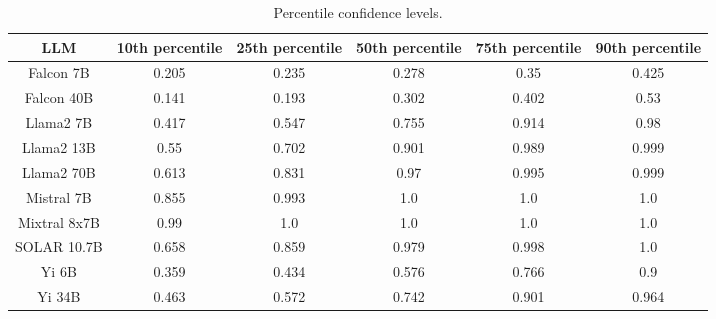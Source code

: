 \begin{table*}
\centering
\begin{tabular}{c|c|c|c|c|c}
LLM & 10th percentile & 25th percentile & 50th percentile & 75th percentile & 90th percentile\\ \hline
Falcon 7B & 0.205 & 0.235 & 0.278 & 0.35 & 0.425\\
Falcon 40B & 0.141 & 0.193 & 0.302 & 0.402 & 0.53\\
Llama2 7B & 0.417 & 0.547 & 0.755 & 0.914 & 0.98\\
Llama2 13B & 0.55 & 0.702 & 0.901 & 0.989 & 0.999\\
Llama2 70B & 0.613 & 0.831 & 0.97 & 0.995 & 0.999\\
Mistral 7B & 0.855 & 0.993 & 1.0 & 1.0 & 1.0\\
Mixtral 8x7B & 0.99 & 1.0 & 1.0 & 1.0 & 1.0\\
SOLAR 10.7B & 0.658 & 0.859 & 0.979 & 0.998 & 1.0\\
Yi 6B & 0.359 & 0.434 & 0.576 & 0.766 & 0.9\\
Yi 34B & 0.463 & 0.572 & 0.742 & 0.901 & 0.964\\
\hline
\end{tabular}
\caption{Percentile confidence levels.}
\label{tab:percentile_conf}
\end{table*}
